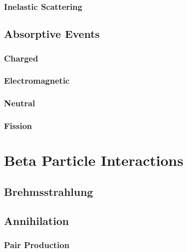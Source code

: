 \subsubsection{Inelastic Scattering}
\subsection{Absorptive Events}
\subsubsection{Charged}
\subsubsection{Electromagnetic}
\subsubsection{Neutral}
\subsubsection{Fission}

\section{Beta Particle Interactions}
\subsection{Brehmsstrahlung}
\subsection{Annihilation}
\subsubsection{Pair Production}



%
%


